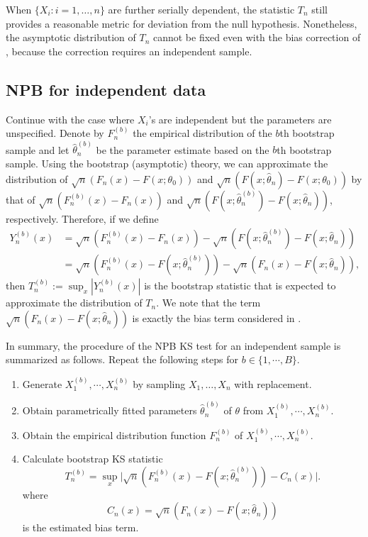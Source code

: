 \documentclass[12pt]{article}
\begin{document}
When $\{X_i: i = 1, \ldots, n\}$ are further serially dependent, the statistic
$T_n$ still provides a reasonable metric for deviation from the null
hypothesis. Nonetheless, the asymptotic distribution of $T_n$ cannot be fixed
even with the bias correction of \citet{babu2004goodness}, because the
correction requires an independent sample.

\subsection{NPB for independent data}

Continue with the case where $X_i$'s are independent but the parameters
are unspecified. Denote by
$F^{(b)}_n$ the empirical distribution of the $b$th bootstrap sample and let
$\hat\theta^{(b)}_n$ be the parameter estimate based on the $b$th bootstrap
sample.
Using the bootstrap (asymptotic) theory, we can approximate the distribution of
$\sqrt{n}(F_n(x) - F(x; \theta_0))$ and
$\sqrt{n}(F(x; \hat\theta_n) - F(x; \theta_0))$
by that of $\sqrt{n}(F^{(b)}_n(x) - F_n(x))$ and
$\sqrt{n}(F(x; \hat\theta^{(b)}_n) - F(x; \hat\theta_n))$, respectively.
Therefore, if we define
\begin{align*}
Y^{(b)}_n(x) &= \sqrt{n}(F^{(b)}_n(x) - F_n(x)) -
               \sqrt{n}(F(x; \hat\theta^{(b)}_n) - F(x; \hat\theta_n)) \\
             &= \sqrt{n}(F^{(b)}_n(x) - F(x; \hat\theta^{(b)}_n)) -
               \sqrt{n}(F_n(x) - F(x; \hat\theta_n)),
\end{align*}
then $T^{(b)}_n := \sup_x|Y^{(b)}_n(x)|$ is the bootstrap statistic that is
expected to approximate the distribution of $T_n$.
We note that the term
$\sqrt{n}(F_n(x) - F(x; \hat\theta_n))$ is exactly the bias term considered in
\citet{babu2004goodness}.


In summary, the procedure of the NPB KS test for an independent sample is
summarized as follows. Repeat the following steps for $b \in \{1,  \cdots , B\}$.
\begin{enumerate}
\item
  Generate $X^{(b)}_1, \cdots ,X^{(b)}_n$ by sampling $X_1, \ldots, X_n$
  with replacement.
\item
  Obtain parametrically
  fitted parameters
	$\hat\theta^{(b)}_n$ of $\theta$ from $X^{(b)}_1, \cdots ,X^{(b)}_n$.
\item
  Obtain the empirical distribution function $F^{(b)}_n$ of
  $X^{(b)}_1, \cdots ,X^{(b)}_n$.
\item
  Calculate bootstrap KS statistic
  \[
    T^{(b)}_n = \sup_x \Big\vert \sqrt{n}\left(F^{(b)}_n(x)
    - F(x; \hat\theta^{(b)}_n)\right) - C_n(x) \Big\vert.
  \]
  where
  \[
    C_{n}(x) = \sqrt{n}(F_n(x) - F(x; \hat\theta_n))
  \]
  is the estimated bias term.
\end{enumerate}
\end{document}
